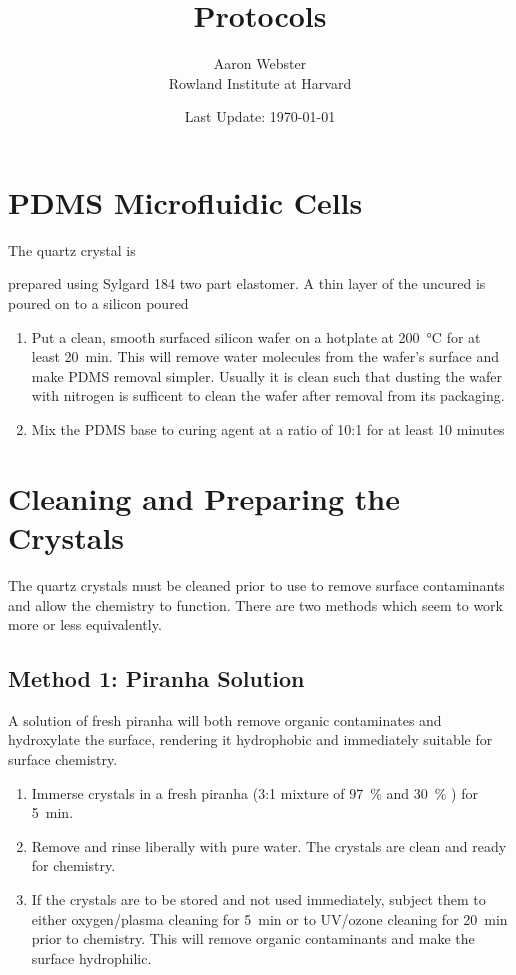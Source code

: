 \documentclass[a4paper]{article}
\begin{document}
\title{Protocols}
\author{Aaron Webster\\ Rowland Institute at Harvard}
\date{Last Update: \today}
\maketitle
\tableofcontents

\section{PDMS Microfluidic Cells}
The quartz crystal is 

prepared using Sylgard 184 two part elastomer.
A thin layer of the uncured is poured on to a silicon 
poured 


\begin{enumerate}

 \item Put a clean, smooth surfaced silicon wafer on a hotplate at
  \SI{200}{\celsius} for at least \SI{20}{\minute}.  This will remove water
  molecules from the wafer's surface and make PDMS removal simpler.
  Usually it is clean such that dusting the wafer with nitrogen is
  sufficent to clean the wafer after removal from its packaging.
 \item 
  
  Mix the PDMS base to curing agent at a ratio of 10:1 for at least 10
  minutes 

\end{enumerate}

\section{Cleaning and Preparing the Crystals}
The quartz crystals must be cleaned prior to use to remove surface
contaminants and allow the chemistry to function.  There are two methods
which seem to work more or less equivalently.
\subsection{Method 1: Piranha Solution}
A solution of fresh piranha will both remove organic contaminates and
hydroxylate the surface, rendering it hydrophobic and immediately suitable
for surface chemistry.
\begin{enumerate}
 \item Immerse crystals in a fresh piranha (3:1 mixture of
  \SI{97}{\percent}  and \SI{30}{\percent} ) for
  \SI{5}{\minute}.  
 \item Remove and rinse liberally with pure water.  The crystals are clean
  and ready for chemistry.  
 \item If the crystals are to be stored and not used immediately, subject
  them to either oxygen/plasma cleaning for \SI{5}{\minute} or to UV/ozone
  cleaning for \SI{20}{\minute} prior to chemistry.  This will remove
  organic contaminants and make the surface hydrophilic.
\end{enumerate}
\end{document}
